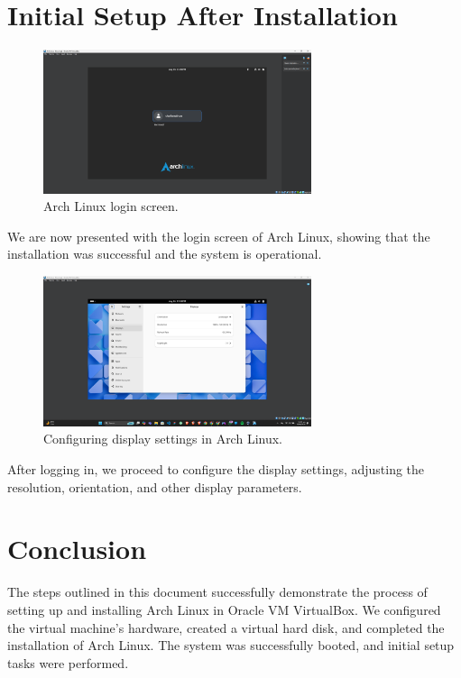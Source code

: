 \documentclass{article}
\begin{document}
\section{Initial Setup After Installation}
\begin{figure}[H]
    \centering
    \includegraphics[width=0.7\textwidth]{11.png}
    \caption{Arch Linux login screen.}
\end{figure}

We are now presented with the login screen of Arch Linux, showing that the installation was successful and the system is operational.

\begin{figure}[H]
    \centering
    \includegraphics[width=0.7\textwidth]{12.png}
    \caption{Configuring display settings in Arch Linux.}
\end{figure}

After logging in, we proceed to configure the display settings, adjusting the resolution, orientation, and other display parameters.

\section{Conclusion}
The steps outlined in this document successfully demonstrate the process of setting up and installing Arch Linux in Oracle VM VirtualBox. We configured the virtual machine's hardware, created a virtual hard disk, and completed the installation of Arch Linux. The system was successfully booted, and initial setup tasks were performed.
\end{document}
